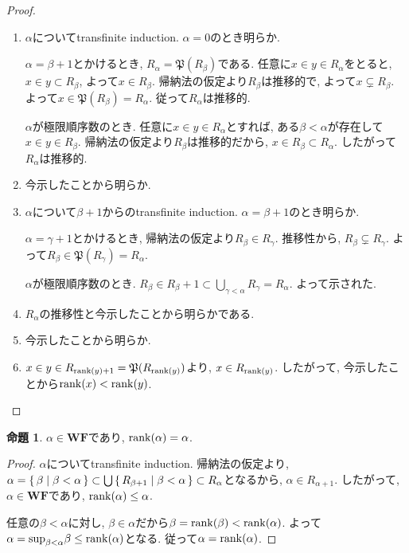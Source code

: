 \documentclass[a4paper, twoside]{bxjsarticle}
\theoremstyle{definition}
\newtheorem{prop}[thm]{命題}
\begin{document}
         \begin{proof}
         \begin{enumerate}
             \item $\alpha$についてtransfinite induction. $\alpha=0$のとき明らか.
             
             $\alpha=\beta+1$とかけるとき, $R_\alpha=\mathfrak{P}(R_\beta)$である. 任意に$x\in y\in R_\alpha$をとると, $x\in y\subset R_\beta$, よって$x\in R_\beta$. 帰納法の仮定より$R_\beta$は推移的で, よって$x \subsetneq R_\beta$. よって$x\in \mathfrak{P}(R_\beta)=R_\alpha$. 従って$R_\alpha$は推移的.
             
             $\alpha$が極限順序数のとき. 任意に$x\in y\in R_\alpha$とすれば, ある$\beta<\alpha$が存在して$x\in y\in R_\beta$. 帰納法の仮定より$R_\beta$は推移的だから, $x\in R_\beta\subset R_\alpha$. したがって$R_\alpha$は推移的.
             \item 今示したことから明らか.
             \item $\alpha$について$\beta+1$からのtransfinite induction. $\alpha=\beta+1$のとき明らか.
             
             $\alpha=\gamma+1$とかけるとき, 帰納法の仮定より$R_\beta\in R_\gamma$. 推移性から, $R_\beta\subsetneq R_\gamma$. よって$R_\beta\in \mathfrak{P}(R_\gamma)=R_\alpha$.
             
             $\alpha$が極限順序数のとき. $R_\beta\in R_\beta+1\subset \bigcup_{\gamma<\alpha}R_\gamma=R_\alpha$. よって示された.
             
             \item $R_\alpha$の推移性と今示したことから明らかである.
             \item 今示したことから明らか.
             \item $x\in y\in R_{{\rm rank}(y)+1}=\mathfrak{P}(R_{{\rm rank}(y)})$より, $x\in R_{{\rm rank}(y)}$. したがって, 今示したことから${\rm rank}(x)<{\rm rank}(y)$.
         \end{enumerate}
         \end{proof}
         \begin{prop}
             $\alpha \in \textbf{WF}$であり, ${\rm rank}(\alpha)=\alpha$.
         \end{prop}
         \begin{proof}
            $\alpha$についてtransfinite induction. 帰納法の仮定より, $\alpha=\set{\beta|\beta<\alpha}\subset\bigcup\set{R_{\beta+1}|\beta<\alpha}\subset R_\alpha$となるから, $\alpha\in R_{\alpha+1}$. したがって, $\alpha\in \textbf{WF}$であり, ${\rm rank}(\alpha)\leq\alpha$.
            
            任意の$\beta<\alpha$に対し, $\beta\in\alpha$だから$\beta={\rm rank}(\beta)<{\rm rank}(\alpha)$. よって$\alpha={\rm sup}_{\beta<\alpha}\beta\leq{\rm rank}(\alpha)$となる. 従って$\alpha={\rm rank}(\alpha)$.
         \end{proof}
\end{document}
